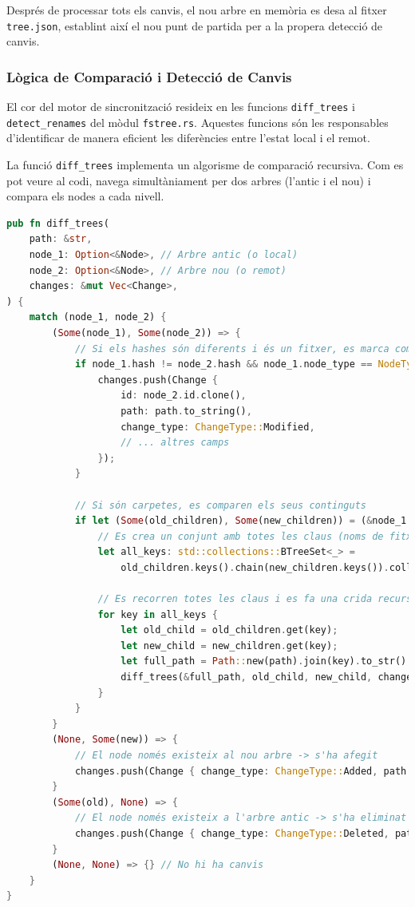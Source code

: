 Després de processar tots els canvis, el nou arbre en memòria es desa al fitxer \texttt{tree.json}, establint així el nou punt de partida per a la propera detecció de canvis.

\subsubsection{Lògica de Comparació i Detecció de Canvis}
El cor del motor de sincronització resideix en les funcions \texttt{diff\_trees} i \texttt{detect\_renames} del mòdul \texttt{fstree.rs}. Aquestes funcions són les responsables d'identificar de manera eficient les diferències entre l'estat local i el remot.

La funció \texttt{diff\_trees} implementa un algorisme de comparació recursiva. Com es pot veure al codi, navega simultàniament per dos arbres (l'antic i el nou) i compara els nodes a cada nivell.

\begin{lstlisting}[language=rust, caption={Lògica de la funció \texttt{diff\_trees} a \texttt{fstree.rs}}]
pub fn diff_trees(
    path: &str,
    node_1: Option<&Node>, // Arbre antic (o local)
    node_2: Option<&Node>, // Arbre nou (o remot)
    changes: &mut Vec<Change>,
) {
    match (node_1, node_2) {
        (Some(node_1), Some(node_2)) => {
            // Si els hashes són diferents i és un fitxer, es marca com a modificat
            if node_1.hash != node_2.hash && node_1.node_type == NodeType::File {
                changes.push(Change {
                    id: node_2.id.clone(),
                    path: path.to_string(),
                    change_type: ChangeType::Modified,
                    // ... altres camps
                });
            }

            // Si són carpetes, es comparen els seus continguts
            if let (Some(old_children), Some(new_children)) = (&node_1.content, &node_2.content) {
                // Es crea un conjunt amb totes les claus (noms de fitxer) dels dos directoris
                let all_keys: std::collections::BTreeSet<_> =
                    old_children.keys().chain(new_children.keys()).collect();

                // Es recorren totes les claus i es fa una crida recursiva
                for key in all_keys {
                    let old_child = old_children.get(key);
                    let new_child = new_children.get(key);
                    let full_path = Path::new(path).join(key).to_str().unwrap().to_string();
                    diff_trees(&full_path, old_child, new_child, changes);
                }
            }
        }
        (None, Some(new)) => {
            // El node només existeix al nou arbre -> s'ha afegit
            changes.push(Change { change_type: ChangeType::Added, path: path.to_string(), ..Default::default() });
        }
        (Some(old), None) => {
            // El node només existeix a l'arbre antic -> s'ha eliminat
            changes.push(Change { change_type: ChangeType::Deleted, path: path.to_string(), ..Default::default() });
        }
        (None, None) => {} // No hi ha canvis
    }
}
\end{lstlisting}

